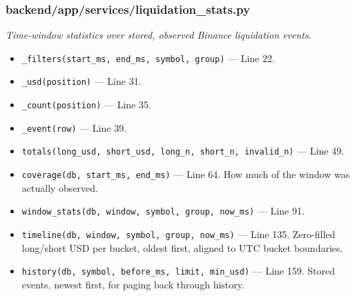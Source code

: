\subsubsection*{backend/app/services/liquidation\_stats.py}
\textit{Time-window statistics over stored, observed Binance liquidation events.}
\begin{itemize}[nosep,leftmargin=1.5em]
\item \texttt{\_\allowbreak{}filters(\allowbreak{}start\_\allowbreak{}ms,\allowbreak{} end\_\allowbreak{}ms,\allowbreak{} symbol,\allowbreak{} group)} --- Line 22.
\item \texttt{\_\allowbreak{}usd(\allowbreak{}position)} --- Line 31.
\item \texttt{\_\allowbreak{}count(\allowbreak{}position)} --- Line 35.
\item \texttt{\_\allowbreak{}event(\allowbreak{}row)} --- Line 39.
\item \texttt{totals(\allowbreak{}long\_\allowbreak{}usd,\allowbreak{} short\_\allowbreak{}usd,\allowbreak{} long\_\allowbreak{}n,\allowbreak{} short\_\allowbreak{}n,\allowbreak{} invalid\_\allowbreak{}n)} --- Line 49.
\item \texttt{coverage(\allowbreak{}db,\allowbreak{} start\_\allowbreak{}ms,\allowbreak{} end\_\allowbreak{}ms)} --- Line 64. How much of the window was actually observed.
\item \texttt{window\_\allowbreak{}stats(\allowbreak{}db,\allowbreak{} window,\allowbreak{} symbol,\allowbreak{} group,\allowbreak{} now\_\allowbreak{}ms)} --- Line 91.
\item \texttt{timeline(\allowbreak{}db,\allowbreak{} window,\allowbreak{} symbol,\allowbreak{} group,\allowbreak{} now\_\allowbreak{}ms)} --- Line 135. Zero-filled long/short USD per bucket, oldest first, aligned to UTC bucket boundaries.
\item \texttt{history(\allowbreak{}db,\allowbreak{} symbol,\allowbreak{} before\_\allowbreak{}ms,\allowbreak{} limit,\allowbreak{} min\_\allowbreak{}usd)} --- Line 159. Stored events, newest first, for paging back through history.
\end{itemize}
